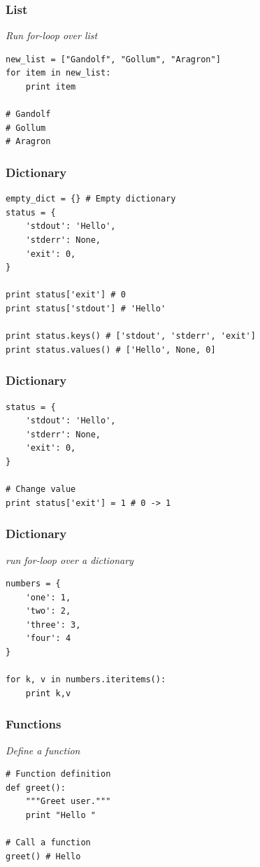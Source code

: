 \documentclass[bigger, presentation]{beamer}
\begin{document}
\begin{frame}[fragile]
\frametitle{List}
\label{sec-2-6}

   \emph{Run for-loop over list}


\begin{verbatim}
new_list = ["Gandolf", "Gollum", "Aragron"]
for item in new_list:
    print item

# Gandolf
# Gollum
# Aragron
\end{verbatim}
\end{frame}
\begin{frame}[fragile]
\frametitle{Dictionary}
\label{sec-2-7}



\begin{verbatim}
empty_dict = {} # Empty dictionary
status = {
    'stdout': 'Hello',
    'stderr': None,
    'exit': 0,
}

print status['exit'] # 0
print status['stdout'] # 'Hello'

print status.keys() # ['stdout', 'stderr', 'exit']
print status.values() # ['Hello', None, 0]
\end{verbatim}
\end{frame}
\begin{frame}[fragile]
\frametitle{Dictionary}
\label{sec-2-8}



\begin{verbatim}
status = {
    'stdout': 'Hello',
    'stderr': None,
    'exit': 0,
}

# Change value
print status['exit'] = 1 # 0 -> 1
\end{verbatim}
\end{frame}
\begin{frame}[fragile]
\frametitle{Dictionary}
\label{sec-2-9}

   \emph{run for-loop over a dictionary}

\begin{verbatim}
numbers = {
    'one': 1,
    'two': 2,
    'three': 3,
    'four': 4
}

for k, v in numbers.iteritems():
    print k,v
\end{verbatim}
\end{frame}
\begin{frame}[fragile]
\frametitle{Functions}
\label{sec-2-10}

   \emph{Define a function}


\begin{verbatim}
# Function definition
def greet():
    """Greet user."""
    print "Hello "

# Call a function
greet() # Hello
\end{verbatim}
\end{frame}
\end{document}
